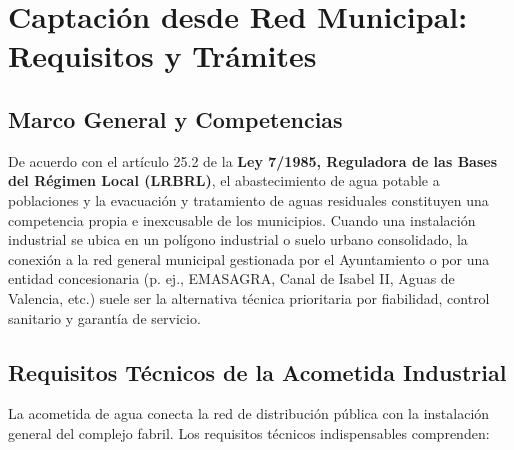 \documentclass{report}
\begin{document}

\chapter{Captación desde Red Municipal: Requisitos y Trámites}



\section{Marco General y Competencias}

De acuerdo con el artículo 25.2 de la \textbf{Ley 7/1985, Reguladora de las Bases del Régimen Local (LRBRL)}, el abastecimiento de agua potable a poblaciones y la evacuación y tratamiento de aguas residuales constituyen una competencia propia e inexcusable de los municipios. Cuando una instalación industrial se ubica en un polígono industrial o suelo urbano consolidado, la conexión a la red general municipal gestionada por el Ayuntamiento o por una entidad concesionaria (p. ej., EMASAGRA, Canal de Isabel II, Aguas de Valencia, etc.) suele ser la alternativa técnica prioritaria por fiabilidad, control sanitario y garantía de servicio.



\section{Requisitos Técnicos de la Acometida Industrial}

La acometida de agua conecta la red de distribución pública con la instalación general del complejo fabril. Los requisitos técnicos indispensables comprenden:
\end{document}
